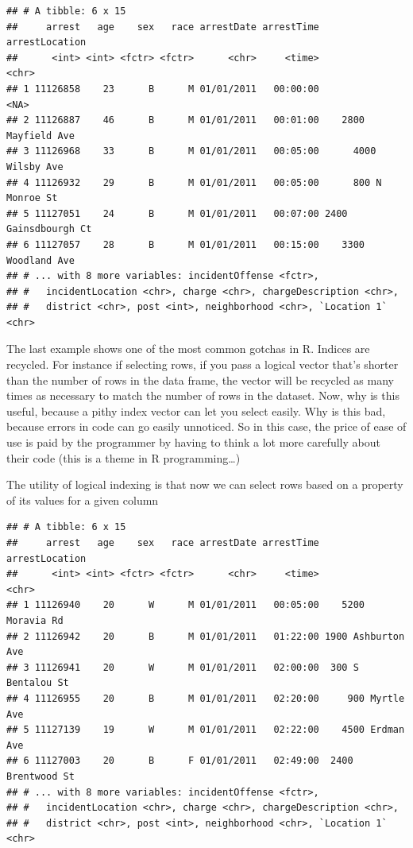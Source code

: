 \documentclass[]{book}
\newenvironment{Shaded}{\begin{snugshade}}{\end{snugshade}}
\newcommand{\KeywordTok}[1]{\textcolor[rgb]{0.13,0.29,0.53}{\textbf{#1}}}
\newcommand{\DecValTok}[1]{\textcolor[rgb]{0.00,0.00,0.81}{#1}}
\newcommand{\StringTok}[1]{\textcolor[rgb]{0.31,0.60,0.02}{#1}}
\newcommand{\CommentTok}[1]{\textcolor[rgb]{0.56,0.35,0.01}{\textit{#1}}}
\newcommand{\OperatorTok}[1]{\textcolor[rgb]{0.81,0.36,0.00}{\textbf{#1}}}
\newcommand{\NormalTok}[1]{#1}
\theoremstyle{definition}
\theoremstyle{definition}
\theoremstyle{remark}
\begin{document}
\begin{verbatim}
## # A tibble: 6 x 15
##     arrest   age    sex   race arrestDate arrestTime       arrestLocation
##      <int> <int> <fctr> <fctr>      <chr>     <time>                <chr>
## 1 11126858    23      B      M 01/01/2011   00:00:00                 <NA>
## 2 11126887    46      B      M 01/01/2011   00:01:00    2800 Mayfield Ave
## 3 11126968    33      B      M 01/01/2011   00:05:00      4000 Wilsby Ave
## 4 11126932    29      B      M 01/01/2011   00:05:00      800 N Monroe St
## 5 11127051    24      B      M 01/01/2011   00:07:00 2400 Gainsdbourgh Ct
## 6 11127057    28      B      M 01/01/2011   00:15:00    3300 Woodland Ave
## # ... with 8 more variables: incidentOffense <fctr>,
## #   incidentLocation <chr>, charge <chr>, chargeDescription <chr>,
## #   district <chr>, post <int>, neighborhood <chr>, `Location 1` <chr>
\end{verbatim}

The last example shows one of the most common gotchas in R. Indices are
recycled. For instance if selecting rows, if you pass a logical vector
that's shorter than the number of rows in the data frame, the vector
will be recycled as many times as necessary to match the number of rows
in the dataset. Now, why is this useful, because a pithy index vector
can let you select easily. Why is this bad, because errors in code can
go easily unnoticed. So in this case, the price of ease of use is paid
by the programmer by having to think a lot more carefully about their
code (this is a theme in R programming\ldots{})

The utility of logical indexing is that now we can select rows based on
a property of its values for a given column

\begin{Shaded}
\end{Shaded}

\begin{verbatim}
## # A tibble: 6 x 15
##     arrest   age    sex   race arrestDate arrestTime     arrestLocation
##      <int> <int> <fctr> <fctr>      <chr>     <time>              <chr>
## 1 11126940    20      W      M 01/01/2011   00:05:00    5200 Moravia Rd
## 2 11126942    20      B      M 01/01/2011   01:22:00 1900 Ashburton Ave
## 3 11126941    20      W      M 01/01/2011   02:00:00  300 S Bentalou St
## 4 11126955    20      B      M 01/01/2011   02:20:00     900 Myrtle Ave
## 5 11127139    19      W      M 01/01/2011   02:22:00    4500 Erdman Ave
## 6 11127003    20      B      F 01/01/2011   02:49:00  2400 Brentwood St
## # ... with 8 more variables: incidentOffense <fctr>,
## #   incidentLocation <chr>, charge <chr>, chargeDescription <chr>,
## #   district <chr>, post <int>, neighborhood <chr>, `Location 1` <chr>
\end{verbatim}
\end{document}
